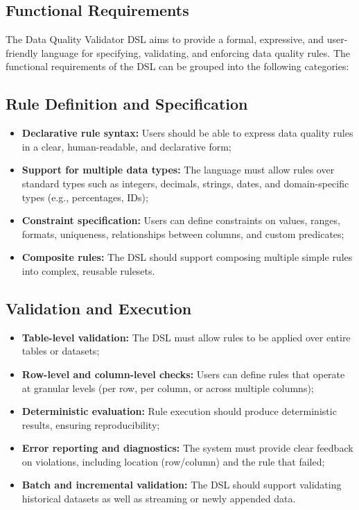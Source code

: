 \begin{itemize}[label=-, noitemsep]
\section{Functional Requirements}

The Data Quality Validator DSL aims to provide a formal, expressive, and user-friendly language for specifying, validating, and enforcing data quality rules. 
The functional requirements of the DSL can be grouped into the following categories:

\subsection{Rule Definition and Specification}
\begin{itemize}[label=-, noitemsep]
    \item \textbf{Declarative rule syntax:} Users should be able to express data quality rules in a clear, human-readable, and declarative form;
    \item \textbf{Support for multiple data types:} The language must allow rules over standard types such as integers, decimals, strings, dates, and domain-specific types (e.g., percentages, IDs);
    \item \textbf{Constraint specification:} Users can define constraints on values, ranges, formats, uniqueness, relationships between columns, and custom predicates;
    \item \textbf{Composite rules:} The DSL should support composing multiple simple rules into complex, reusable rulesets.
\end{itemize}

\subsection{Validation and Execution}
\begin{itemize}[label=-, noitemsep]
    \item \textbf{Table-level validation:} The DSL must allow rules to be applied over entire tables or datasets;
    \item \textbf{Row-level and column-level checks:} Users can define rules that operate at granular levels (per row, per column, or across multiple columns);
    \item \textbf{Deterministic evaluation:} Rule execution should produce deterministic results, ensuring reproducibility;
    \item \textbf{Error reporting and diagnostics:} The system must provide clear feedback on violations, including location (row/column) and the rule that failed;
    \item \textbf{Batch and incremental validation:} The DSL should support validating historical datasets as well as streaming or newly appended data.
\end{itemize}


\end{itemize}
